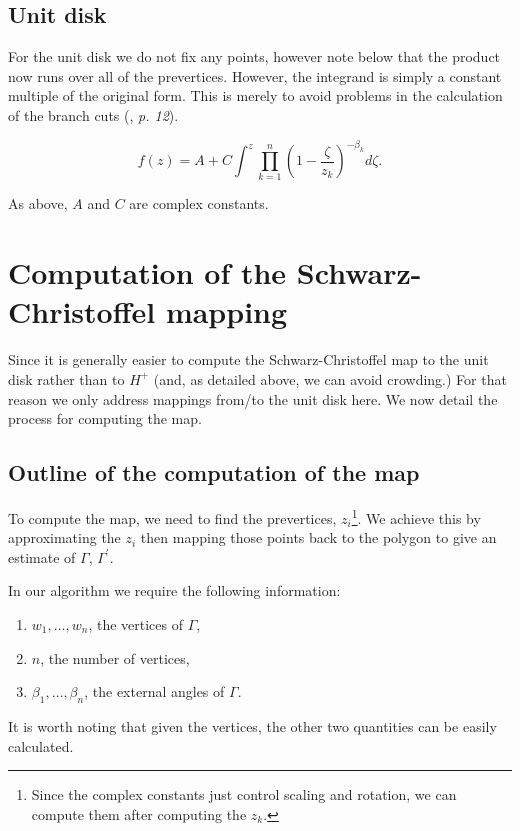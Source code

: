 \documentclass[a4paper,10pt]{amsart}
\newcommand{\sch}{Schwarz-Christoffel }
\begin{document}
\subsection{Unit disk}

For the unit disk we do not fix any points, however note below that the product now runs over all of the prevertices. However, the integrand is simply a constant multiple of the original form. This is merely to avoid problems in the calculation of the branch cuts (\cite{driscoll}, \emph{p. 12}).

\begin{equation}
\label{unitscmap}
f(z) = A + C \int^z \prod_{k=1}^{n} (1 - \frac{\zeta}{z_k})^{-\beta_k} d\zeta.
\end{equation}

As above, $A$ and $C$ are complex constants.

\section{Computation of the \sch mapping}

Since it is generally easier to compute the \sch map to the unit disk rather than to $H^+$ (and, as detailed above, we can avoid crowding.) For that reason we only address mappings from/to the unit disk here. We now detail the process for computing the map.


\subsection{Outline of the computation of the map}
To compute the map, we need to find the prevertices, $z_i$\footnote{Since the complex constants just control scaling and rotation, we can compute them after computing the $z_k$.}. We achieve this by approximating the $z_i$ then mapping those points back to the polygon to give an estimate of $\Gamma$, $\Gamma^\prime$. 

In our algorithm we require the following information: 

\begin{enumerate}
\item $w_1, \dots, w_n$, the vertices of $\Gamma$,
\item $n$, the number of vertices,
\item $\beta_1, \dots, \beta_n$, the external angles of $\Gamma$.
\end{enumerate}

It is worth noting that given the vertices, the other two quantities can be easily calculated.
\end{document}
